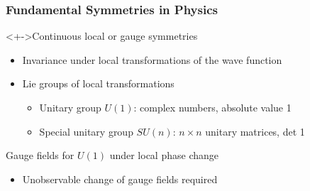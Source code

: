 \begin{frame}[t]
 \frametitle{Fundamental Symmetries in Physics}
 \begin{block}<+->{Continuous local or gauge symmetries}
  \begin{itemize}
   \item Invariance under \alert{local transformations of the wave function}
   \item Lie groups of local transformations
   \begin{itemize}
    \item \alert{Unitary group $U(1)$}: complex numbers, absolute value 1
    \item \alert{Special unitary group $SU(n)$}: $n \times n$ unitary matrices, det 1
   \end{itemize}
  \end{itemize}
 \end{block}
 \begin{block}{Gauge fields for $U(1)$ under local phase change}
  \begin{itemize}
   \item Unobservable \alert{change of gauge fields} required
   \begin{center}
   \end{center}
  \end{itemize}
 \end{block}
\end{frame}
